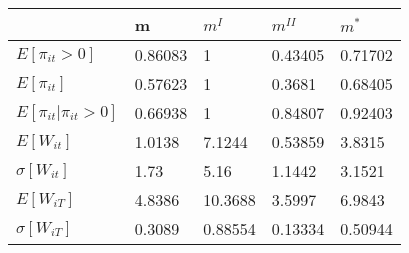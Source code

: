 \begin{tabular}{lllll}
& m & $m^I$ & $m^{II}$ & $m^*$ \\ 
\hline 
$E[\pi_{it}>0]$ & 0.86083 & 1 & 0.43405 & 0.71702 \\ 
$E[\pi_{it}]$ & 0.57623 & 1 & 0.3681 & 0.68405 \\ 
$E[\pi_{it}|\pi_{it}>0]$ & 0.66938 & 1 & 0.84807 & 0.92403 \\ 
$E[W_{it}]$ & 1.0138 & 7.1244 & 0.53859 & 3.8315 \\ 
$\sigma[W_{it}]$ & 1.73 & 5.16 & 1.1442 & 3.1521 \\ 
$E[W_{iT}]$ & 4.8386 & 10.3688 & 3.5997 & 6.9843 \\ 
$\sigma[W_{iT}]$ & 0.3089 & 0.88554 & 0.13334 & 0.50944 \\ 
\hline 
\end{tabular}